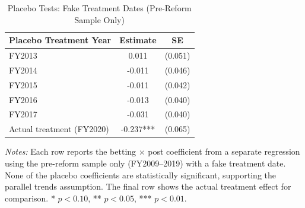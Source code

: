 \begin{table}[H]
\centering
\caption{Placebo Tests: Fake Treatment Dates (Pre-Reform Sample Only)}
\begin{threeparttable}
\begin{tabular}{lcc}
\toprule
Placebo Treatment Year & Estimate & SE \\
\midrule
FY2013 & 0.011 & (0.051) \\
FY2014 & -0.011 & (0.046) \\
FY2015 & -0.011 & (0.042) \\
FY2016 & -0.013 & (0.040) \\
FY2017 & -0.031 & (0.040) \\
\midrule
Actual treatment (FY2020) & -0.237*** & (0.065) \\
\bottomrule
\end{tabular}
\begin{tablenotes}[flushleft]
\small
\item \textit{Notes:} Each row reports the betting $\times$ post coefficient from a separate regression using the pre-reform sample only (FY2009--2019) with a fake treatment date. None of the placebo coefficients are statistically significant, supporting the parallel trends assumption. The final row shows the actual treatment effect for comparison. * $p<0.10$, ** $p<0.05$, *** $p<0.01$.
\end{tablenotes}
\end{threeparttable}
\label{tab:placebo}
\end{table}

